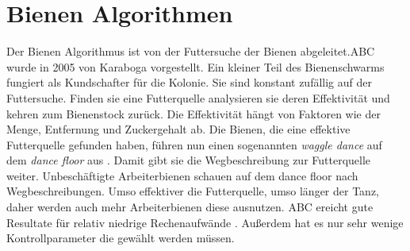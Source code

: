 \section{Bienen Algorithmen}
Der Bienen Algorithmus ist von der Futtersuche der Bienen abgeleitet.ABC wurde in 2005 von Karaboga vorgestellt\cite{karaboga2005idea}. Ein kleiner Teil des Bienenschwarms fungiert als Kundschafter für die Kolonie.
Sie sind konstant zufällig auf der Futtersuche. Finden sie eine Futterquelle analysieren sie deren Effektivität und kehren zum Bienenstock zurück. Die Effektivität hängt von Faktoren wie der Menge, Entfernung und Zuckergehalt ab.\cite{PHAM2006454}
Die Bienen, die eine effektive Futterquelle gefunden haben, führen nun einen sogenannten \emph{waggle dance} auf dem \emph{dance floor} aus \cite{Seeley+1995}. Damit gibt sie die Wegbeschreibung zur Futterquelle weiter.
Unbeschäftigte Arbeiterbienen schauen auf dem dance floor nach Wegbeschreibungen. Umso effektiver die Futterquelle, umso länger der Tanz, daher werden auch mehr Arbeiterbienen diese ausnutzen.\cite{KARABOGA2009108} ABC ereicht gute Resultate für relativ niedrige Rechenaufwände \cite*{karaboga2008performance}. Außerdem hat es nur sehr wenige Kontrollparameter die gewählt werden müssen.\\

